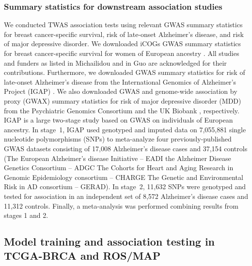 \subsubsection{Summary statistics
for downstream association studies}

We conducted TWAS association tests
using relevant GWAS summary statistics
for breast cancer-specific survival, risk of late-onset Alzheimer's disease, and
risk of major depressive disorder.
We downloaded
iCOGs GWAS summary statistics for
breast cancer-specific survival for
women of European ancestry \cite{Guo2015}.
All studies and 
funders as listed in Michailidou
\etal{} \cite{Michailidou2013,Michailidou2015} 
and in Guo \etal{} \cite{Guo2015} 
are acknowledged for their contributions.
Furthermore, we downloaded
GWAS summary statistics for risk of
late-onset Alzheimer's disease 
from the International Genomics
of Alzheimer's Project (IGAP)
\cite{Lambert2013Meta-analysisDisease}.
We also downloaded GWAS and genome-wide
association by proxy (GWAX) summary statistics
for risk of major depressive
disorder (MDD) from the Psychiatric Genomics
Consortium \cite{Wray2018Genome-wideDepression}
and the UK Biobank \cite{Liu2017Case-controlDisease}, respectively.
IGAP is a large two-stage study based on GWAS 
on individuals of European ancestry. 
In stage~1, IGAP used genotyped and 
imputed data on 7,055,881 single 
nucleotide polymorphisms (SNPs) to 
meta-analyze four previously-published
GWAS datasets consisting of 17,008
Alzheimer's disease cases and 
37,154 controls (The European 
Alzheimer's disease Initiative --
EADI the Alzheimer Disease Genetics 
Consortium -- ADGC The Cohorts for
Heart and Aging Research in Genomic 
Epidemiology consortium -- CHARGE The 
Genetic and Environmental Risk in AD 
consortium -- GERAD). In stage~2, 11,632
SNPs were genotyped and tested for 
association in an independent set of 
8,572 Alzheimer's disease cases and 
11,312 controls. Finally, a 
meta-analysis was performed combining results from stages 1 and 2.

\subsection{Model training
and association testing in
TCGA-BRCA and ROS/MAP}

